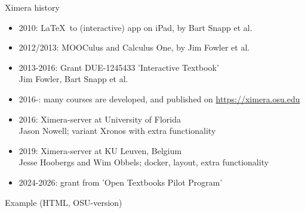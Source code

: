 \begin{frame}{Ximera history}
  \begin{itemize}[<+->]
    \item 2010: \LaTeX\ to (interactive) app on iPad, by Bart Snapp et al.
    \item 2012/2013: MOOCulus and Calculus One, by Jim Fowler et al.
    \item 2013-2016: Grant DUE-1245433  'Interactive Textbook' \\  Jim Fowler, Bart Snapp et al.
    \item 2016-: many courses are developed, and published on \url{https://ximera.osu.edu}
    \item 2016: Ximera-server at University of Florida \\ Jason Nowell; variant Xronos with extra functionality
    \item 2019: Ximera-server at KU Leuven, Belgium \\ Jesse Hoobergs and Wim Obbels; docker, layout, extra functionality
    \item 2024-2026: grant from 'Open Textbooks Pilot Program'
  \end{itemize}

\end{frame}

\begin{frame}[t]{Example (HTML, OSU-version)}
  \begin{center}
  \end{center}
\end{frame}

